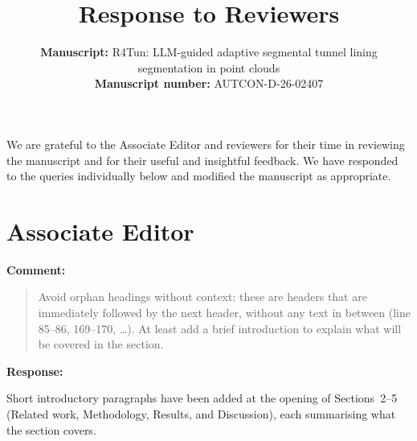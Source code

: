 \documentclass[11pt,a4paper]{article}
\title{Response to Reviewers}
\author{%
  \parbox{\textwidth}{%
    \textbf{Manuscript:} R4Tun: LLM-guided adaptive segmental tunnel lining segmentation in point clouds\\[0.4em]
    \textbf{Manuscript number:} AUTCON-D-26-02407
  }%
}
\date{}
\newcommand{\MSRuntimeTable}{Table~7}
\newcommand{\MSErrorCompositionTable}{Table~9}
\newcommand{\MSSOTATable}{Table~10}
\newcommand{\MSErrorMechanismFigure}{Fig.~11}
\newcommand{\MSErrorMapFigure}{Fig.~12}
\newcommand{\MSAppendixRepeatability}{Appendix~7}
\newenvironment{commentblock}{%
  \par\smallskip\noindent\textbf{Comment:}\par
  \begin{quote}\itshape\color{black}
}{%
  \end{quote}\smallskip
}
\newenvironment{responseblock}{%
  \par\smallskip\noindent\textbf{Response:}\par
  \begingroup\color{responsegreen}
}{%
  \endgroup\smallskip
}
\begin{document}
\maketitle

We are grateful to the Associate Editor and reviewers for their time in reviewing the manuscript and for their useful and insightful feedback. We have responded to the queries individually below and modified the manuscript as appropriate.


\section*{Associate Editor}

\begin{commentblock}
Avoid orphan headings without context: these are headers that are immediately followed by the next header, without any text in between (line 85--86, 169--170, \ldots). At least add a brief introduction to explain what will be covered in the section.
\end{commentblock}
\begin{responseblock}
Short introductory paragraphs have been added at the opening of Sections~2--5 (Related work, Methodology, Results, and Discussion), each summarising what the section covers.
\end{responseblock}
\end{document}
